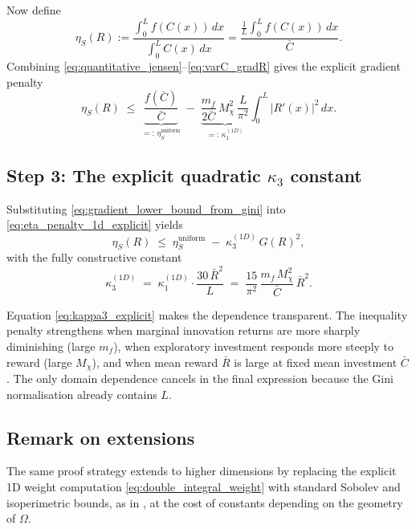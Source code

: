 \documentclass[12pt,a4paper]{article}
\theoremstyle{definition}
\begin{document}
Now define
\[
\eta_S(R):=\frac{\int_0^L f(C(x))\,dx}{\int_0^L C(x)\,dx}
= \frac{\frac{1}{L}\int_0^L f(C(x))\,dx}{\bar C}.
\]
Combining \eqref{eq:quantitative_jensen}--\eqref{eq:varC_gradR} gives the explicit gradient penalty
\begin{equation}
  \eta_S(R)
  \;\le\;
  \underbrace{\frac{f(\bar C)}{\bar C}}_{=: \,\eta_S^{\mathrm{uniform}}}
  \;-\;
  \underbrace{\frac{m_f}{2\bar C}\,M_\chi^2\,\frac{L}{\pi^2}}_{=: \,\kappa_1^{(1D)}}
  \int_0^L |R'(x)|^2\,dx.
  \label{eq:eta_penalty_1d_explicit}
\end{equation}

\subsection{Step 3: The explicit quadratic $\kappa_3$ constant}

Substituting \eqref{eq:gradient_lower_bound_from_gini} into
\eqref{eq:eta_penalty_1d_explicit} yields
\begin{equation}
  \eta_S(R)
  \;\le\;
  \eta_S^{\mathrm{uniform}}
  \;-\;
  \kappa_3^{(1D)}\,G(R)^2,
  \label{eq:eta_gini_bound_1d_explicit}
\end{equation}
with the fully constructive constant
\begin{equation}
  \kappa_3^{(1D)}
  \;=\;
  \kappa_1^{(1D)}\cdot \frac{30\,\bar R^2}{L}
  \;=\;
  \frac{15}{\pi^2}\,
  \frac{m_f\,M_\chi^2}{\bar C}\,
  \bar R^2.
  \label{eq:kappa3_explicit}
\end{equation}

Equation \eqref{eq:kappa3_explicit} makes the dependence transparent.
The inequality penalty strengthens when marginal innovation returns are more sharply diminishing
(large $m_f$), when exploratory investment responds more steeply to reward (large $M_\chi$),
and when mean reward $\bar R$ is large at fixed mean investment $\bar C$.
The only domain dependence cancels in the final expression because the Gini normalisation
already contains $L$.

\subsection{Remark on extensions}

The same proof strategy extends to higher dimensions by replacing the explicit 1D weight
computation \eqref{eq:double_integral_weight} with standard Sobolev and isoperimetric bounds,
as in \citet{lieb2001}, at the cost of constants depending on the geometry of $\Omega$.
\end{document}
